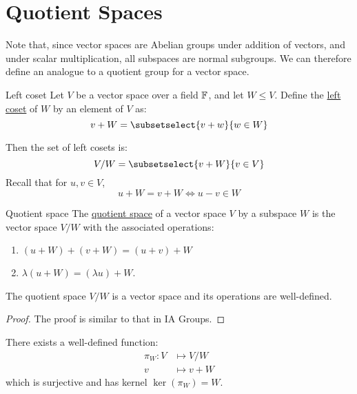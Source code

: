 \documentclass[../Main.tex]{subfiles}
\begin{document}
\section{Quotient Spaces}
Note that, since vector spaces are Abelian groups under addition of vectors, and under scalar multiplication, all subspaces are normal subgroups. We can therefore define an analogue to a quotient group for a vector space.
\begin{definition}{Left coset}
    Let $V$ be a vector space over a field $\mathbb{F}$, and let $W \leq V$. Define the \underline{left coset} of $W$ by an element of $V$ as:
    \begin{equation*}
        v + W = \subsetselect{v + w}{w \in W} 
    \end{equation*}
\end{definition}
Then the set of left cosets is:
\begin{equation*}
    V / W = \subsetselect{v + W}{v \in V}
\end{equation*}
Recall that for $u, v \in V$,
\begin{equation}
    u + W = v + W \Leftrightarrow u - v \in W
    \label{eqnCosetEquality}
\end{equation}
\begin{definition}{Quotient space}
    The \underline{quotient space} of a vector space $V$ by a subspace $W$ is the vector space $V / W$ with the associated operations:
    \begin{enumerate}
        \item $(u + W) + (v + W) = (u + v) + W$
        \item $\lambda(u + W) = (\lambda u) + W$.
    \end{enumerate}
\end{definition}
\begin{proposition}
    The quotient space $V / W$ is a vector space and its operations are well-defined.
    \label{propQuotientSpace}
\end{proposition}
\begin{proof}
    The proof is similar to that in IA Groups.
\end{proof}
\begin{proposition}
    There exists a well-defined function:
    \begin{align*}
        \pi_W : V &\mapsto V / W \\
        v &\mapsto v + W
    \end{align*}
    which is surjective and has kernel $\ker(\pi_W) = W$.
    \label{propQuotMap}
\end{proposition}
\end{document}
